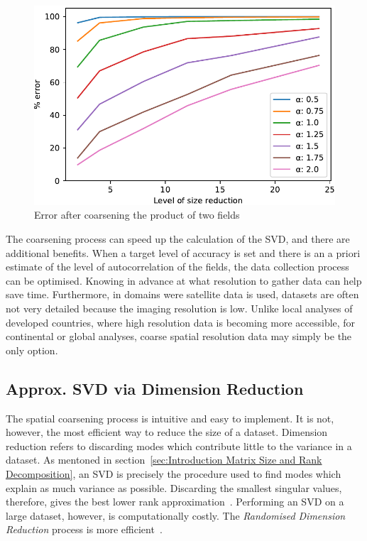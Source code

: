 \documentclass[sigconf]{acmart}
\begin{document}
\begin{figure}[h]
\begin{center}
\includegraphics[width=0.8\columnwidth]{Results/plotProductSpatialTemporalFieldsViaCoarsening.pdf}
\caption[Error after coarsening product of fields]{Error after coarsening the product of two fields}
\label{fig:plotProductSpatialTemporalFieldsViaCoarsening}
\end{center}
\end{figure}
The coarsening process can speed up the calculation of the SVD, and there are additional benefits. When a target level of accuracy is set and there is an a priori estimate of the level of autocorrelation of the fields, the data collection process can be optimised. Knowing in advance at what resolution to gather data can help save time. Furthermore, in domains were satellite data is used, datasets are often not very detailed because the imaging resolution is low. Unlike local analyses of developed countries, where high resolution data is becoming more accessible, for continental or global analyses, coarse spatial resolution data may simply be the only option.

\subsection{Approx. SVD via Dimension Reduction}
\label{sec:Techniques Approximate SVD via Dimension Reduction}

The spatial coarsening process is intuitive and easy to implement. It is not, however, the most efficient way to reduce the size of a dataset. Dimension reduction refers to discarding modes which contribute little to the variance in a dataset. As mentoned in section~\ref{sec:Introduction Matrix Size and Rank Decomposition}, an SVD is precisely the procedure used to find modes which explain as much variance as possible. Discarding the smallest singular values, therefore, gives the best lower rank approximation~\cite{Eckart1936, Martinsson2016}. Performing an SVD on a large dataset, however, is computationally costly. The \textit{Randomised Dimension Reduction} process is more efficient~\cite{Halko2011, Li2016}.
\end{document}
